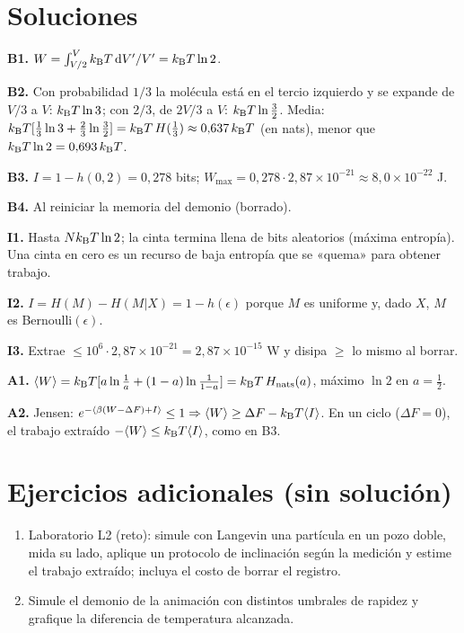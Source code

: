 \documentclass[11pt,a4paper]{article}
\begin{document}
\section{Soluciones}
\begin{solucion}
\textbf{B1.} $W=\int_{V/2}^{V}k_{\mathrm B} T\,\mathrm{d} V'/V'=k_{\mathrm B} T\ln2$.

\textbf{B2.} Con probabilidad $1/3$ la molécula está en el tercio izquierdo y se expande de $V/3$ a $V$: $k_{\mathrm B} T\ln3$; con $2/3$, de $2V/3$ a $V$: $k_{\mathrm B} T\ln\frac32$. Media: $k_{\mathrm B} T[\frac13\ln3+\frac23\ln\frac32]=k_{\mathrm B} T\,H(\frac13)\approx0{,}637\,k_{\mathrm B} T$ (en nats), menor que $k_{\mathrm B} T\ln2=0{,}693\,k_{\mathrm B} T$.

\textbf{B3.} $I=1-h(0{,}2)=0{,}278$ bits; $W_{\max}=0{,}278\cdot2{,}87\times10^{-21}\approx8{,}0\times10^{-22}$ J.

\textbf{B4.} Al reiniciar la memoria del demonio (borrado).

\textbf{I1.} Hasta $Nk_{\mathrm B} T\ln2$; la cinta termina llena de bits aleatorios (máxima entropía). Una cinta en cero es un recurso de baja entropía que se «quema» para obtener trabajo.

\textbf{I2.} $I=H(M)-H(M|X)=1-h(\epsilon)$ porque $M$ es uniforme y, dado $X$, $M$ es Bernoulli$(\epsilon)$.

\textbf{I3.} Extrae $\le10^6\cdot2{,}87\times10^{-21}=2{,}87\times10^{-15}$ W y disipa $\ge$ lo mismo al borrar.

\textbf{A1.} $\langle W\rangle=k_{\mathrm B} T[a\ln\frac1a+(1-a)\ln\frac1{1-a}]=k_{\mathrm B} T\,H_{\text{nats}}(a)$, máximo $\ln2$ en $a=\frac12$.

\textbf{A2.} Jensen: $e^{-\langle\beta(W-\Delta F)+I\rangle}\le1\Rightarrow\langle W\rangle\ge\Delta F-k_{\mathrm B} T\langle I\rangle$. En un ciclo ($\Delta F=0$), el trabajo extraído $-\langle W\rangle\le k_{\mathrm B} T\langle I\rangle$, como en B3.
\end{solucion}

\section{Ejercicios adicionales (sin solución)}
\begin{enumerate}[label=\textbf{P\arabic*.}]
\item Laboratorio L2 (reto): simule con Langevin una partícula en un pozo doble, mida su lado, aplique un protocolo de inclinación según la medición y estime el trabajo extraído; incluya el costo de borrar el registro.
\item Simule el demonio de la animación con distintos umbrales de rapidez y grafique la diferencia de temperatura alcanzada.
\end{enumerate}
\end{document}
